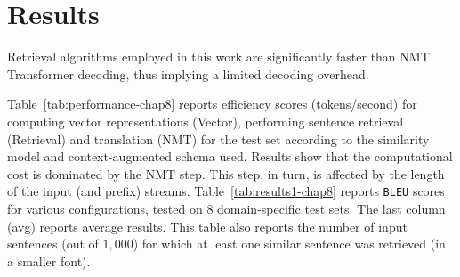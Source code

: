\section{Results}
\label{sec:results-chap8}

Retrieval algorithms employed in this work are significantly faster than NMT Transformer decoding, thus implying a limited decoding overhead.
%

\begin{table}[h!]
\begin{center}
\end{center}
\caption{\label{tab:performance-chap8} Efficiency (tokens/second) of each step for different inference configurations. All steps run on CPU (16 cores). K stands for thousands.}
\end{table}

Table~\ref{tab:performance-chap8} reports efficiency scores (tokens/second) for computing vector representations (Vector), performing sentence retrieval (Retrieval) and translation (NMT) for the  test set according to the similarity model and context-augmented schema used. Results show that the computational cost is dominated by the NMT step. This step, in turn, is affected by the length of the input (and prefix) streams. Table~\ref{tab:results1-chap8} reports \texttt{BLEU} scores for various configurations, tested on $8$ domain-specific test sets. The last column (avg) reports average results. This table also reports the number of input sentences (out of $1,000$)  for which at least one similar sentence was retrieved (in a smaller font).


